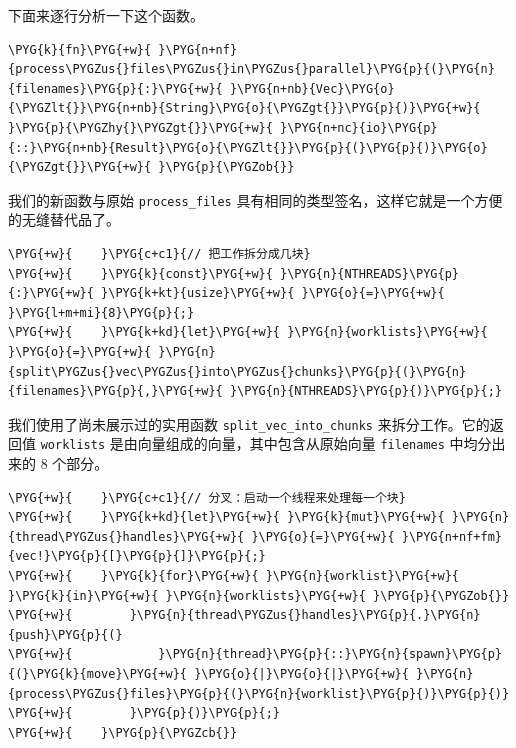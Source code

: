 下面来逐行分析一下这个函数。

\begin{Verbatim}[commandchars=\\\{\},breaklines=true,breakanywhere=true,fontsize=\codefont,xleftmargin=17bp]
\PYG{k}{fn}\PYG{+w}{ }\PYG{n+nf}{process\PYGZus{}files\PYGZus{}in\PYGZus{}parallel}\PYG{p}{(}\PYG{n}{filenames}\PYG{p}{:}\PYG{+w}{ }\PYG{n+nb}{Vec}\PYG{o}{\PYGZlt{}}\PYG{n+nb}{String}\PYG{o}{\PYGZgt{}}\PYG{p}{)}\PYG{+w}{ }\PYG{p}{\PYGZhy{}\PYGZgt{}}\PYG{+w}{ }\PYG{n+nc}{io}\PYG{p}{::}\PYG{n+nb}{Result}\PYG{o}{\PYGZlt{}}\PYG{p}{(}\PYG{p}{)}\PYG{o}{\PYGZgt{}}\PYG{+w}{ }\PYG{p}{\PYGZob{}}
\end{Verbatim}

我们的新函数与原始 \texttt{process\_files} 具有相同的类型签名，这样它就是一个方便的无缝替代品了。

\begin{Verbatim}[commandchars=\\\{\},breaklines=true,breakanywhere=true,fontsize=\codefont,xleftmargin=17bp]
\PYG{+w}{    }\PYG{c+c1}{// 把工作拆分成几块}
\PYG{+w}{    }\PYG{k}{const}\PYG{+w}{ }\PYG{n}{NTHREADS}\PYG{p}{:}\PYG{+w}{ }\PYG{k+kt}{usize}\PYG{+w}{ }\PYG{o}{=}\PYG{+w}{ }\PYG{l+m+mi}{8}\PYG{p}{;}
\PYG{+w}{    }\PYG{k+kd}{let}\PYG{+w}{ }\PYG{n}{worklists}\PYG{+w}{ }\PYG{o}{=}\PYG{+w}{ }\PYG{n}{split\PYGZus{}vec\PYGZus{}into\PYGZus{}chunks}\PYG{p}{(}\PYG{n}{filenames}\PYG{p}{,}\PYG{+w}{ }\PYG{n}{NTHREADS}\PYG{p}{)}\PYG{p}{;}
\end{Verbatim}

我们使用了尚未展示过的实用函数 \texttt{split\_vec\_into\_chunks} 来拆分工作。它的返回值 \texttt{worklists} 是由向量组成的向量，其中包含从原始向量 \texttt{filenames} 中均分出来的 8 个部分。

\begin{Verbatim}[commandchars=\\\{\},breaklines=true,breakanywhere=true,fontsize=\codefont,xleftmargin=17bp]
\PYG{+w}{    }\PYG{c+c1}{// 分叉：启动一个线程来处理每一个块}
\PYG{+w}{    }\PYG{k+kd}{let}\PYG{+w}{ }\PYG{k}{mut}\PYG{+w}{ }\PYG{n}{thread\PYGZus{}handles}\PYG{+w}{ }\PYG{o}{=}\PYG{+w}{ }\PYG{n+nf+fm}{vec!}\PYG{p}{[}\PYG{p}{]}\PYG{p}{;}
\PYG{+w}{    }\PYG{k}{for}\PYG{+w}{ }\PYG{n}{worklist}\PYG{+w}{ }\PYG{k}{in}\PYG{+w}{ }\PYG{n}{worklists}\PYG{+w}{ }\PYG{p}{\PYGZob{}}
\PYG{+w}{        }\PYG{n}{thread\PYGZus{}handles}\PYG{p}{.}\PYG{n}{push}\PYG{p}{(}
\PYG{+w}{            }\PYG{n}{thread}\PYG{p}{::}\PYG{n}{spawn}\PYG{p}{(}\PYG{k}{move}\PYG{+w}{ }\PYG{o}{|}\PYG{o}{|}\PYG{+w}{ }\PYG{n}{process\PYGZus{}files}\PYG{p}{(}\PYG{n}{worklist}\PYG{p}{)}\PYG{p}{)}
\PYG{+w}{        }\PYG{p}{)}\PYG{p}{;}
\PYG{+w}{    }\PYG{p}{\PYGZcb{}}
\end{Verbatim}

